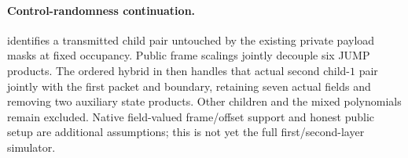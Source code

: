 \paragraph{Control-randomness continuation.}  identifies a transmitted child pair untouched by the existing private payload masks at fixed occupancy. Public frame scalings jointly decouple six JUMP products. The ordered hybrid in  then handles that actual second child-$1$ pair jointly with the first packet and boundary, retaining seven actual fields and removing two auxiliary state products. Other children and the mixed polynomials remain excluded. Native field-valued frame/offset support and honest public setup are additional assumptions; this is not yet the full first/second-layer simulator.
